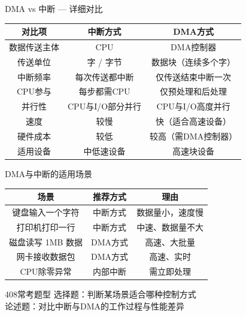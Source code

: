 \documentclass[10pt, aspectratio=169]{beamer}
\begin{document}
\begin{frame}{DMA vs 中断 --- 详细对比}
    \begin{center}
        \begin{tabular}{|c|c|c|}
            \hline
            \textbf{对比项} & \textbf{中断方式} & \textbf{DMA方式} \\
            \hline
            数据传送主体 & CPU & DMA控制器 \\
            传送单位 & 字 / 字节 & 数据块（连续多个字） \\
            中断频率 & 每次传送都中断 & 仅传送结束中断一次 \\
            CPU参与 & 每步都需CPU & 仅预处理和后处理 \\
            并行性 & CPU与I/O部分并行 & CPU与I/O高度并行 \\
            速度 & 较慢 & 快（适合高速设备） \\
            硬件成本 & 较低 & 较高（需DMA控制器） \\
            适用设备 & 中低速设备 & 高速块设备 \\
            \hline
        \end{tabular}
    \end{center}
\end{frame}

\begin{frame}{DMA与中断的适用场景}
    \begin{center}
        \begin{tabular}{|c|c|c|}
            \hline
            \textbf{场景} & \textbf{推荐方式} & \textbf{理由} \\
            \hline
            键盘输入一个字符 & 中断方式 & 数据量小，速度慢 \\
            打印机打印一行 & 中断方式 & 中速、数据量不大 \\
            磁盘读写 1MB 数据 & DMA方式 & 高速、大批量 \\
            网卡接收数据包 & DMA方式 & 高速、实时 \\
            CPU除零异常 & 内部中断 & 需立即处理 \\
            \hline
        \end{tabular}
    \end{center}
    \vspace{0.5em}
    \begin{block}{408常考题型}
        选择题：判断某场景适合哪种控制方式 \\
        论述题：对比中断与DMA的工作过程与性能差异
    \end{block}
\end{frame}
\end{document}
